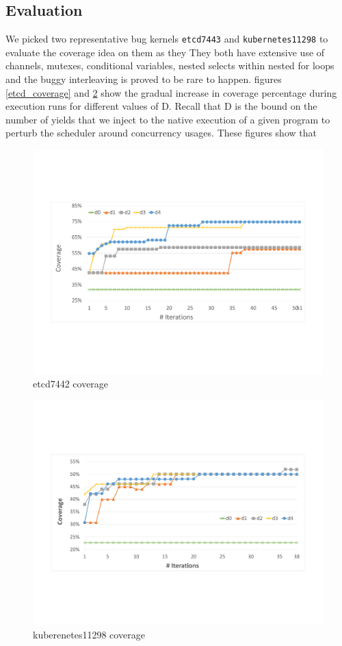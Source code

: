\subsection{Evaluation}
We picked two representative bug kernels \texttt{etcd7443} and \texttt{kubernetes11298} to evaluate the coverage idea on them as they
%
They both have extensive use of channels, mutexes, conditional variables, nested selects within nested for loops and the buggy interleaving is proved to be rare to happen.
%
figures \ref{etcd_coverage} and \ref{fig:kubernetes_coverage} show the gradual increase in coverage percentage during execution runs for different values of D.
%
Recall that D is the bound on the number of yields that we inject to the native execution of a given program to perturb the scheduler around concurrency usages.
%
These figures show that
%

\begin{figure}
\centering
  \includegraphics[width=.95\linewidth]{figs/coverage_etcd7443.pdf}
  \caption{etcd7442 coverage}
  \label{fig:etcd_coverage}
\end{figure}


\begin{figure}
\centering
  \includegraphics[width=.95\linewidth]{figs/coverage_kubernetes11298.pdf}
  \caption{kuberenetes11298 coverage}
  \label{fig:kubernetes_coverage}
\end{figure}
